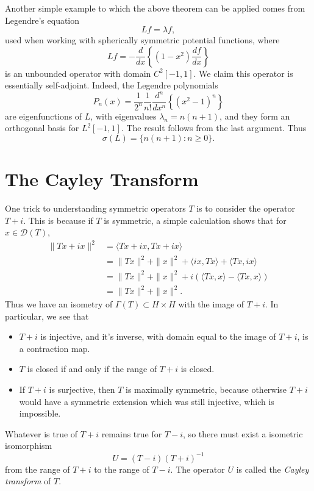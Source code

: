 \begin{example}
    Another simple example to which the above theorem can be applied comes from Legendre's equation
    \[ Lf = \lambda f, \]
    used when working with spherically symmetric potential functions, where
    \[ Lf = - \frac{d}{dx} \left\{ (1 - x^2) \frac{df}{dx} \right\} \]
    is an unbounded operator with domain $C^2[-1,1]$. We claim this operator is essentially self-adjoint. Indeed, the Legendre polynomials
    \[ P_n(x) = \frac{1}{2^n} \frac{1}{n!} \frac{d^n}{dx^n} \left\{ (x^2 - 1)^n \right\} \]
    are eigenfunctions of $L$, with eigenvalues $\lambda_n = n(n+1)$, and they form an orthogonal basis for $L^2[-1,1]$. The result follows from the last argument. Thus
    \[ \sigma(L) = \{ n(n+1): n \geq 0 \}. \]
\end{example}

\section{The Cayley Transform}

One trick to understanding symmetric operators $T$ is to consider the operator $T + i$. This is because if $T$ is symmetric, a simple calculation shows that for $x \in \mathcal{D}(T)$,
%
\begin{align*}
    \| Tx + i x \|^2 &= \langle Tx + i x, Tx + ix \rangle\\
    &= \| Tx \|^2 + \| x \|^2 + \langle ix, Tx \rangle + \langle Tx, ix \rangle\\
    &= \| Tx \|^2 + \| x \|^2 + i \left( \langle Tx, x \rangle - \langle Tx, x \rangle \right)\\
    &= \| Tx \|^2 + \| x \|^2.
\end{align*}
%
Thus we have an isometry of $\Gamma(T) \subset H \times H$ with the image of $T + i$. In particular, we see that
%
\begin{itemize}
    \item $T + i$ is injective, and it's inverse, with domain equal to the image of $T + i$, is a contraction map.
    \item $T$ is closed if and only if the range of $T + i$ is closed.
    \item If $T + i$ is surjective, then $T$ is maximally symmetric, because otherwise $T + i$ would have a symmetric extension which was still injective, which is impossible.
\end{itemize}
%
Whatever is true of $T + i$ remains true for $T - i$, so there must exist a isometric isomorphism
%
\[ U = (T - i) (T + i)^{-1} \]
%
from the range of $T + i$ to the range of $T - i$. The operator $U$ is called the \emph{Cayley transform} of $T$.

